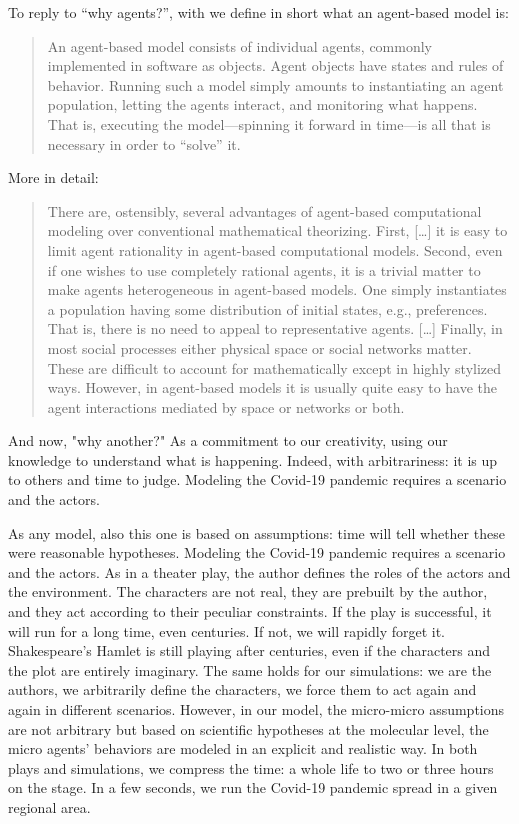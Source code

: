 \documentclass[graybox]{svmult}
\begin{document}
To reply to ``why agents?'', with \cite{axtell2000agents} we define in short what an agent-based model is:
\begin{quote} 
An agent-based model consists of individual agents, commonly implemented in software as objects. Agent objects have states and rules of behavior. Running such a model simply amounts to instantiating an agent population, letting the agents interact, and monitoring what happens. That is, executing the model---spinning it forward in time---is all that is necessary in order to ``solve'' it.
\end{quote}

More in detail:
\begin{quote} 
There are, ostensibly, several advantages of agent-based computational modeling over conventional mathematical theorizing. First, [\ldots] it is easy to limit agent rationality in agent-based computational models. Second, even if one wishes to use completely rational agents, it is a trivial matter to make agents heterogeneous in agent-based models. One simply instantiates a population having some distribution of initial states, e.g., preferences. That is, there is no need to appeal to representative agents. [\ldots] Finally, in most social processes either physical space or social networks matter. These are difficult to account for mathematically except in highly stylized ways. However, in agent-based models it is usually quite easy to have the agent interactions mediated by space or networks or both.
\end{quote}

And now, "why another?" As a commitment to our creativity, using our knowledge to understand what is happening. Indeed, with arbitrariness: it is up to others and time to judge. Modeling the Covid-19 pandemic requires a scenario and the actors.

As any model, also this one is based on assumptions: time will tell whether these were reasonable hypotheses. Modeling the Covid-19 pandemic requires a scenario and the actors. As in a theater play, the author defines the roles of the actors and the environment. The characters are not real, they are prebuilt by the author, and they act according to their peculiar constraints. If the play is successful, it will run for a long time, even centuries. If not, we will rapidly forget it. Shakespeare’s Hamlet is still playing after centuries, even if the characters and the plot are entirely imaginary. The same holds for our simulations: we are the authors, we arbitrarily define the characters, we force them to act again and again in different scenarios. However, in our model, the micro-micro assumptions are not arbitrary but based on scientific hypotheses at the molecular level, the micro agents’ behaviors are modeled in an explicit and realistic way. In both plays and simulations, we compress the time: a whole life to two or three hours on the stage. In a few seconds, we run the Covid-19 pandemic spread in a given regional area.
\end{document}
